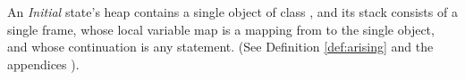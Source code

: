 An \emph{Initial} state's heap contains a single object of class , and
its  stack   consists of a single frame, whose local variable map is a
mapping from  to the single object, and whose continuation is  any statement.
(See Definition %
\ref{def:arising} and the 
{appendices %
\cite{necessityFull}).}




